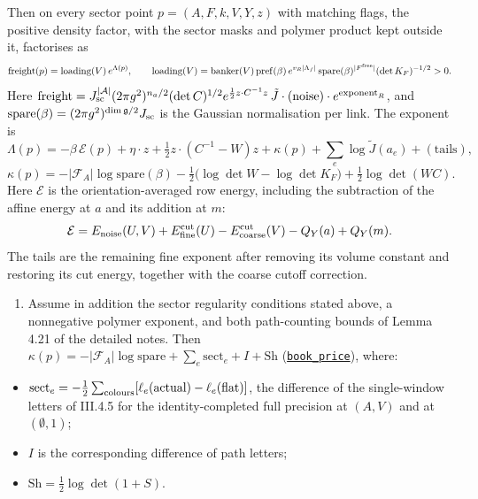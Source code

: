 \documentclass[
  letterpaper,
  11pt]{article}
\providecommand{\tightlist}{%
  \setlength{\itemsep}{0pt}\setlength{\parskip}{0pt}}
\begin{document}
Then on every sector point \(p=(A,F,k,V,Y,z)\) with matching flags, the
positive density factor, with the sector masks and polymer product kept
outside it, factorises as
\[\text{freight}(p)=\text{loading}(V)\,e^{\Lambda(p)},\qquad \text{loading}(V)=\text{banker}(V)\,\mathrm{pref}(\beta)\,e^{v_R\lvert\Lambda_f\rvert}\,\mathrm{spare}(\beta)^{\lvert F^{\rm free}\rvert}(\det K_F)^{-1/2}>0.\]
Here
\(\text{freight}=J_{\rm sc}^{\lvert\mathcal A\rvert}(2\pi g^2)^{n_a/2}(\det C)^{1/2}e^{\frac12 z\cdot C^{-1}z}\,\tilde J\cdot(\text{noise})\cdot e^{\mathrm{exponent}_R}\),
and \(\mathrm{spare}(\beta)=(2\pi g^2)^{\dim\mathfrak g/2}J_{\rm sc}\)
is the Gaussian normalisation per link. The exponent is
\[\Lambda(p)=-\beta\,\mathcal E(p)+\eta\cdot z+\tfrac12z\cdot(C^{-1}-W)z+\kappa(p)+\sum_e\log\tilde J(a_e)+(\text{tails}),\]
\[\kappa(p)=-\lvert\mathcal F_A\rvert\log\mathrm{spare}(\beta)-\tfrac12\big(\log\det W-\log\det K_F\big)+\tfrac12\log\det(WC).\]
Here \(\mathcal E\) is the orientation-averaged row energy, including
the subtraction of the affine energy at \(a\) and its addition at \(m\):
\[\mathcal E=E_{\rm noise}(U,V)+E_{\rm fine}^{\rm cut}(U)-E_{\rm coarse}^{\rm cut}(V)-Q_Y(a)+Q_Y(m).\]
The tails are the remaining fine exponent after removing its volume
constant and restoring its cut energy, together with the coarse cutoff
correction.

\begin{enumerate}
\def\labelenumi{(\roman{enumi})}
\setcounter{enumi}{2}
\tightlist
\item
  Assume in addition the sector regularity conditions stated above, a
  nonnegative polymer exponent, and both path-counting bounds of Lemma
  4.21 of the detailed notes. Then
  \(\kappa(p)=-\lvert\mathcal F_A\rvert\log\mathrm{spare}+\sum_e\mathrm{sect}_e+I+\mathrm{Sh}\)
  (\href{https://github.com/yang-mills-group/OpenAI-YM-20261028/blob/3456e5e75cf8d4cd558955a5c7638fba2d68f464/YM/PhysicalNext/AFTERNOON_INTERACTING_RANK_COMPARISON/Opacity/Shards.lean\#L34-L39}{\texttt{book\_price}}),
  where:
\end{enumerate}

\begin{itemize}
\tightlist
\item
  \(\mathrm{sect}_e=-\tfrac12\sum_{\rm colours}[\ell_e(\text{actual})-\ell_e(\text{flat})]\),
  the difference of the single-window letters of III.4.5 for the
  identity-completed full precision at \((A,V)\) and at
  \((\emptyset,1)\);
\item
  \(I\) is the corresponding difference of path letters;
\item
  \(\mathrm{Sh}=\tfrac12\log\det(1+S)\).
\end{itemize}
\end{document}
